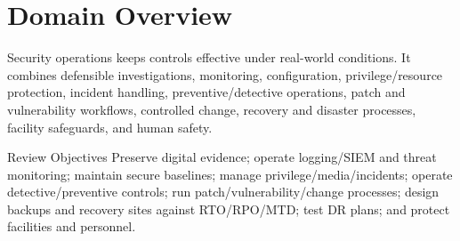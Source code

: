 \documentclass[10pt,letterpaper]{article}
\title{\CornellDocumentTitle}
\author{Arthur Deane and Aaron Kraus}
\date{\today}
\begin{document}
\maketitle

\section*{Domain Overview}
Security operations keeps controls effective under real-world conditions. It combines defensible investigations, monitoring, configuration, privilege/resource protection, incident handling, preventive/detective operations, patch and vulnerability workflows, controlled change, recovery and disaster processes, facility safeguards, and human safety.

\begin{summarybox}{Review Objectives}
Preserve digital evidence; operate logging/SIEM and threat monitoring; maintain secure baselines; manage privilege/media/incidents; operate detective/preventive controls; run patch/vulnerability/change processes; design backups and recovery sites against RTO/RPO/MTD; test DR plans; and protect facilities and personnel.
\end{summarybox}
\end{document}
